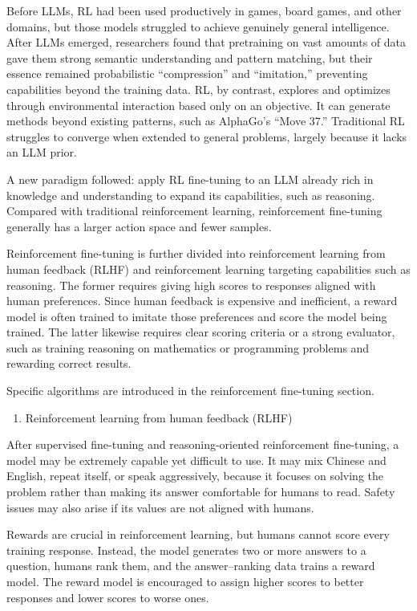 Before LLMs, RL had been used productively in games, board games, and other domains, but those models struggled to achieve genuinely general intelligence. After LLMs emerged, researchers found that pretraining on vast amounts of data gave them strong semantic understanding and pattern matching, but their essence remained probabilistic ``compression'' and ``imitation,'' preventing capabilities beyond the training data. RL, by contrast, explores and optimizes through environmental interaction based only on an objective. It can generate methods beyond existing patterns, such as AlphaGo's ``Move 37.'' Traditional RL struggles to converge when extended to general problems, largely because it lacks an LLM prior.

A new paradigm followed: apply RL fine-tuning to an LLM already rich in knowledge and understanding to expand its capabilities, such as reasoning. Compared with traditional reinforcement learning, reinforcement fine-tuning generally has a larger action space and fewer samples.

Reinforcement fine-tuning is further divided into reinforcement learning from human feedback (RLHF) and reinforcement learning targeting capabilities such as reasoning. The former requires giving high scores to responses aligned with human preferences. Since human feedback is expensive and inefficient, a reward model is often trained to imitate those preferences and score the model being trained. The latter likewise requires clear scoring criteria or a strong evaluator, such as training reasoning on mathematics or programming problems and rewarding correct results.

Specific algorithms are introduced in the reinforcement fine-tuning section.

\begin{enumerate}
\def\labelenumi{\arabic{enumi}.}
\setcounter{enumi}{2}
\tightlist
\item
  Reinforcement learning from human feedback (RLHF)
\end{enumerate}

After supervised fine-tuning and reasoning-oriented reinforcement fine-tuning, a model may be extremely capable yet difficult to use. It may mix Chinese and English, repeat itself, or speak aggressively, because it focuses on solving the problem rather than making its answer comfortable for humans to read. Safety issues may also arise if its values are not aligned with humans.

Rewards are crucial in reinforcement learning, but humans cannot score every training response. Instead, the model generates two or more answers to a question, humans rank them, and the answer--ranking data trains a reward model. The reward model is encouraged to assign higher scores to better responses and lower scores to worse ones.

